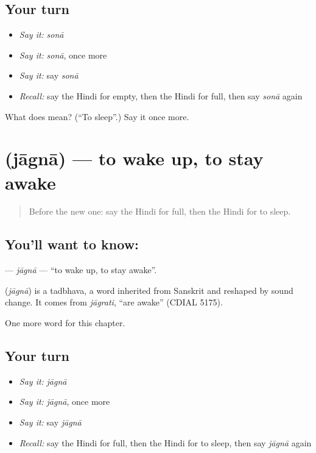 \subsection*{Your turn}
\begin{itemize}
\raggedright
  \item \emph{Say it:} \emph{sonā}
  \item \emph{Say it:} \emph{sonā}, once more
  \item \emph{Say it:} say \emph{sonā}
  \item \emph{Recall:} say the Hindi for empty, then the Hindi for full, then say \emph{sonā} again
\end{itemize}

\begin{tcolorbox}[breakable,colback=teal!4,colframe=teal!35!black,title={Before you move on}]
What does  mean? (\textquotedblleft{}To sleep\textquotedblright{}.) Say it once more.
\end{tcolorbox}
\section[\texorpdfstring{\hi{जागना} (jāgnā)}{जागना (jāgnā)}]{ (jāgnā) — to wake up, to stay awake}

\label{lesson:HI-C159-jagna}



\begin{quote}
Before the new one: say the Hindi for full, then the Hindi for to sleep.
\end{quote}

\subsection*{You'll want to know: }
\textbf{} — \emph{jāgnā} — \textquotedblleft{}to wake up, to stay awake\textquotedblright{}.

\begin{cousinweb}
\textbf{} (\emph{jāgnā}) is a tadbhava, a word inherited from Sanskrit and reshaped by sound change. It comes from \emph{jāgrati}, \textquotedblleft{}are awake\textquotedblright{} (CDIAL 5175).
\end{cousinweb}

\begin{grammarlens}[title={What you've built}]
One more word for this chapter.
\end{grammarlens}

\subsection*{Your turn}
\begin{itemize}
\raggedright
  \item \emph{Say it:} \emph{jāgnā}
  \item \emph{Say it:} \emph{jāgnā}, once more
  \item \emph{Say it:} say \emph{jāgnā}
  \item \emph{Recall:} say the Hindi for full, then the Hindi for to sleep, then say \emph{jāgnā} again
\end{itemize}

